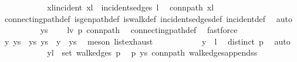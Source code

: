 \begin{isabellebody}
\ \ \ \ \ \ \ \ \isamarkupfalse%
\ \isamarkupfalse%
\ xl{\isacharunderscore}{\kern0pt}incident{\isacharcolon}{\kern0pt}\ {\isachardoublequoteopen}{\isacharbraceleft}{\kern0pt}x{\isacharcomma}{\kern0pt}l{\isacharbraceright}{\kern0pt}\ {\isasymin}\ incident{\isacharunderscore}{\kern0pt}sedges\ l{\isachardoublequoteclose}\ \isamarkupfalse%
\ conn{\isacharunderscore}{\kern0pt}path\ {\isacartoucheopen}x{\isasymnoteq}l{\isacartoucheclose}\isanewline
\ \ \ \ \ \ \ \ \ \ \isamarkupfalse%
\ connecting{\isacharunderscore}{\kern0pt}path{\isacharunderscore}{\kern0pt}def\ is{\isacharunderscore}{\kern0pt}gen{\isacharunderscore}{\kern0pt}path{\isacharunderscore}{\kern0pt}def\ is{\isacharunderscore}{\kern0pt}walk{\isacharunderscore}{\kern0pt}def\ incident{\isacharunderscore}{\kern0pt}sedges{\isacharunderscore}{\kern0pt}def\ incident{\isacharunderscore}{\kern0pt}def\ \isamarkupfalse%
\ auto\isanewline
\isanewline
\ \ \ \ \ \ \ \ \isamarkupfalse%
\ {\isachardoublequoteopen}ys\ {\isasymnoteq}\ {\isacharbrackleft}{\kern0pt}{\isacharbrackright}{\kern0pt}{\isachardoublequoteclose}\ \isamarkupfalse%
\ {\isacartoucheopen}l{\isasymnoteq}v{\isacartoucheclose}\ p\ conn{\isacharunderscore}{\kern0pt}path\ \isamarkupfalse%
\ connecting{\isacharunderscore}{\kern0pt}path{\isacharunderscore}{\kern0pt}def\ \isamarkupfalse%
\ fastforce\isanewline
\ \ \ \ \ \ \ \ \isamarkupfalse%
\ \isamarkupfalse%
\ y\ ys{\isacharprime}{\kern0pt}\ \ ys{\isacharcolon}{\kern0pt}\ {\isachardoublequoteopen}ys\ {\isacharequal}{\kern0pt}\ y\ {\isacharhash}{\kern0pt}\ ys{\isacharprime}{\kern0pt}{\isachardoublequoteclose}\ \isamarkupfalse%
\ {\isacharparenleft}{\kern0pt}meson\ list{\isachardot}{\kern0pt}exhaust{\isacharparenright}{\kern0pt}\isanewline
\ \ \ \ \ \ \ \ \isamarkupfalse%
\ \isamarkupfalse%
\ {\isachardoublequoteopen}y\ {\isasymnoteq}\ l{\isachardoublequoteclose}\ \isamarkupfalse%
\ distinct\ p\ \isamarkupfalse%
\ auto\isanewline
\ \ \ \ \ \ \ \ \isamarkupfalse%
\ \isamarkupfalse%
\ {\isachardoublequoteopen}{\isacharbraceleft}{\kern0pt}y{\isacharcomma}{\kern0pt}l{\isacharbraceright}{\kern0pt}\ {\isasymin}\ set\ {\isacharparenleft}{\kern0pt}walk{\isacharunderscore}{\kern0pt}edges\ p{\isacharparenright}{\kern0pt}{\isachardoublequoteclose}\ \isamarkupfalse%
\ p\ ys\ conn{\isacharunderscore}{\kern0pt}path\ walk{\isacharunderscore}{\kern0pt}edges{\isacharunderscore}{\kern0pt}append{\isacharunderscore}{\kern0pt}ss{}\ \isamarkupfalse%

\end{isabellebody}
